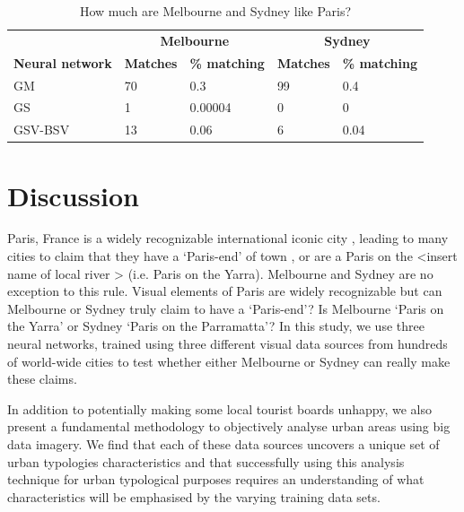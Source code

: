 \documentclass[sageh,times]{sagej}
\begin{document}
\begin{table}[!htbp]
\caption{How much are Melbourne and Sydney like Paris? \label{tab:melbournesydneyparis}}     
\begin{tabular}{| l | l |l| l | l|}
 \hline    &  \multicolumn{2}{c|}{\textbf{Melbourne}} & \multicolumn{2}{c|}{\textbf{Sydney}}  \\  
\textbf{Neural network} & \textbf{Matches} & \textbf{\% matching}  & \textbf{Matches} & \textbf{\% matching}\\ \hline
GM & 70 & 0.3 & 99 & 0.4 \\ \hline
GS & 1 & 0.00004 & 0 & 0 \\ \hline
GSV-BSV & 13 & 0.06 & 6 & 0.04 \\ \hline

\end{tabular}
\end{table}









\section{Discussion}\label{sec:discussion}
Paris, France is a widely recognizable international iconic city \citep{Anholt2006}, leading to many cities to claim that they have a `Paris-end' of town \citep{Williams2010}, or are a Paris on the \textless insert name of local river \textgreater \citep{Wilden2013} (i.e. Paris on the Yarra). Melbourne and Sydney are no exception to this rule. Visual elements of Paris are widely recognizable \citep{Doersch2012} but can Melbourne or Sydney truly claim to have a `Paris-end'? Is Melbourne `Paris on the Yarra' or Sydney `Paris on the Parramatta'? In this study, we use three neural networks, trained using three different visual data sources from hundreds of world-wide cities to test whether either Melbourne or Sydney can really make these claims. 

In addition to potentially making some local tourist boards unhappy, we also present a fundamental methodology to objectively analyse urban areas using big data imagery. We find that each of these data sources uncovers a unique set of urban typologies characteristics and that successfully using this analysis technique for urban typological purposes requires an understanding of what characteristics will be emphasised by the varying training data sets.
\end{document}
